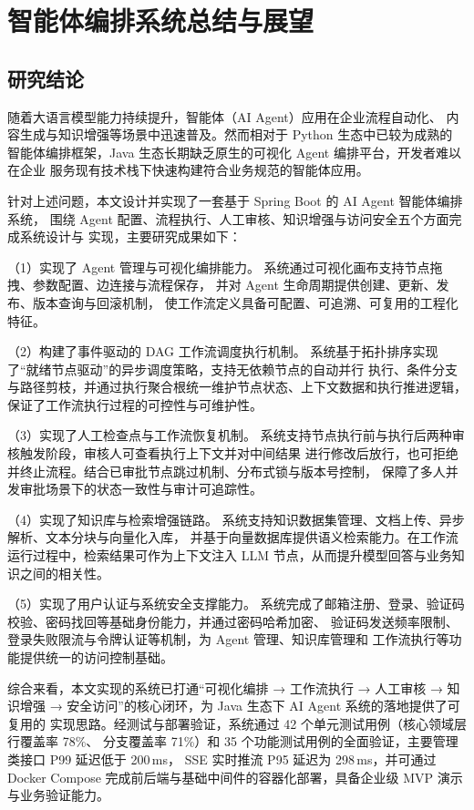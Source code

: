 
\chapter*{智能体编排系统总结与展望}

\section*{研究结论}

随着大语言模型能力持续提升，智能体（AI Agent）应用在企业流程自动化、
内容生成与知识增强等场景中迅速普及。然而相对于 Python 生态中已较为成熟的
智能体编排框架，Java 生态长期缺乏原生的可视化 Agent 编排平台，开发者难以在企业
服务现有技术栈下快速构建符合业务规范的智能体应用。

针对上述问题，本文设计并实现了一套基于 Spring Boot 的 AI Agent 智能体编排系统，
围绕 Agent 配置、流程执行、人工审核、知识增强与访问安全五个方面完成系统设计与
实现，主要研究成果如下：

（1）实现了 Agent 管理与可视化编排能力。
系统通过可视化画布支持节点拖拽、参数配置、边连接与流程保存，
并对 Agent 生命周期提供创建、更新、发布、版本查询与回滚机制，
使工作流定义具备可配置、可追溯、可复用的工程化特征。

（2）构建了事件驱动的 DAG 工作流调度执行机制。
系统基于拓扑排序实现了“就绪节点驱动”的异步调度策略，支持无依赖节点的自动并行
执行、条件分支与路径剪枝，并通过执行聚合根统一维护节点状态、上下文数据和执行推进逻辑，
保证了工作流执行过程的可控性与可维护性。

（3）实现了人工检查点与工作流恢复机制。
系统支持节点执行前与执行后两种审核触发阶段，审核人可查看执行上下文并对中间结果
进行修改后放行，也可拒绝并终止流程。结合已审批节点跳过机制、分布式锁与版本号控制，
保障了多人并发审批场景下的状态一致性与审计可追踪性。

（4）实现了知识库与检索增强链路。
系统支持知识数据集管理、文档上传、异步解析、文本分块与向量化入库，
并基于向量数据库提供语义检索能力。在工作流运行过程中，检索结果可作为上下文注入
 LLM 节点，从而提升模型回答与业务知识之间的相关性。

（5）实现了用户认证与系统安全支撑能力。
系统完成了邮箱注册、登录、验证码校验、密码找回等基础身份能力，并通过密码哈希加密、
验证码发送频率限制、登录失败限流与令牌认证等机制，为 Agent 管理、知识库管理和
工作流执行等功能提供统一的访问控制基础。

综合来看，本文实现的系统已打通“可视化编排 → 工作流执行 → 人工审核 →
知识增强 → 安全访问”的核心闭环，为 Java 生态下 AI Agent 系统的落地提供了可复用的
实现思路。经测试与部署验证，系统通过 42 个单元测试用例（核心领域层行覆盖率 78\%、
分支覆盖率 71\%）和 35 个功能测试用例的全面验证，主要管理类接口 P99 延迟低于 200\,ms，
SSE 实时推流 P95 延迟为 298\,ms，并可通过 Docker Compose 完成前后端与基础中间件的容器化部署，具备企业级 MVP 演示与业务验证能力。


